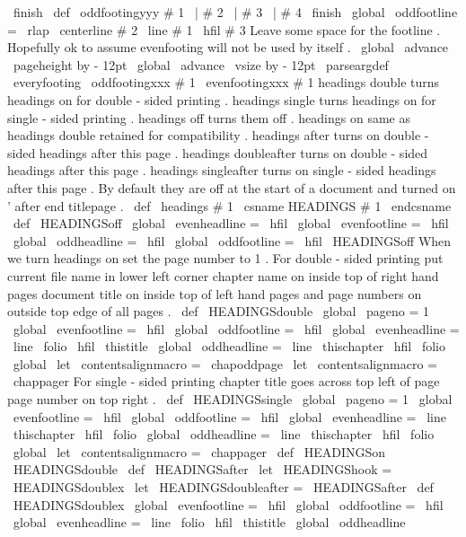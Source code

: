 {{\
finish
}
\
def
\
oddfootingyyy
#
1
\
|
#
2
\
|
#
3
\
|
#
4
\
finish
{
%
\
global
\
oddfootline
=
{
\
rlap
{
\
centerline
{
#
2
}
}
\
line
{
#
1
\
hfil
#
3
}
}
%
%
%
Leave
some
space
for
the
footline
.
Hopefully
ok
to
assume
%
evenfooting
will
not
be
used
by
itself
.
\
global
\
advance
\
pageheight
by
-
12pt
\
global
\
advance
\
vsize
by
-
12pt
}
\
parseargdef
\
everyfooting
{
\
oddfootingxxx
{
#
1
}
\
evenfootingxxx
{
#
1
}
}
%
headings
double
turns
headings
on
for
double
-
sided
printing
.
%
headings
single
turns
headings
on
for
single
-
sided
printing
.
%
headings
off
turns
them
off
.
%
headings
on
same
as
headings
double
retained
for
compatibility
.
%
headings
after
turns
on
double
-
sided
headings
after
this
page
.
%
headings
doubleafter
turns
on
double
-
sided
headings
after
this
page
.
%
headings
singleafter
turns
on
single
-
sided
headings
after
this
page
.
%
By
default
they
are
off
at
the
start
of
a
document
%
and
turned
on
'
after
end
titlepage
.
\
def
\
headings
#
1
{
\
csname
HEADINGS
#
1
\
endcsname
}
\
def
\
HEADINGSoff
{
%
\
global
\
evenheadline
=
{
\
hfil
}
\
global
\
evenfootline
=
{
\
hfil
}
\
global
\
oddheadline
=
{
\
hfil
}
\
global
\
oddfootline
=
{
\
hfil
}
}
\
HEADINGSoff
%
When
we
turn
headings
on
set
the
page
number
to
1
.
%
For
double
-
sided
printing
put
current
file
name
in
lower
left
corner
%
chapter
name
on
inside
top
of
right
hand
pages
document
%
title
on
inside
top
of
left
hand
pages
and
page
numbers
on
outside
top
%
edge
of
all
pages
.
\
def
\
HEADINGSdouble
{
%
\
global
\
pageno
=
1
\
global
\
evenfootline
=
{
\
hfil
}
\
global
\
oddfootline
=
{
\
hfil
}
\
global
\
evenheadline
=
{
\
line
{
\
folio
\
hfil
\
thistitle
}
}
\
global
\
oddheadline
=
{
\
line
{
\
thischapter
\
hfil
\
folio
}
}
\
global
\
let
\
contentsalignmacro
=
\
chapoddpage
}
\
let
\
contentsalignmacro
=
\
chappager
%
For
single
-
sided
printing
chapter
title
goes
across
top
left
of
page
%
page
number
on
top
right
.
\
def
\
HEADINGSsingle
{
%
\
global
\
pageno
=
1
\
global
\
evenfootline
=
{
\
hfil
}
\
global
\
oddfootline
=
{
\
hfil
}
\
global
\
evenheadline
=
{
\
line
{
\
thischapter
\
hfil
\
folio
}
}
\
global
\
oddheadline
=
{
\
line
{
\
thischapter
\
hfil
\
folio
}
}
\
global
\
let
\
contentsalignmacro
=
\
chappager
}
\
def
\
HEADINGSon
{
\
HEADINGSdouble
}
\
def
\
HEADINGSafter
{
\
let
\
HEADINGShook
=
\
HEADINGSdoublex
}
\
let
\
HEADINGSdoubleafter
=
\
HEADINGSafter
\
def
\
HEADINGSdoublex
{
%
\
global
\
evenfootline
=
{
\
hfil
}
\
global
\
oddfootline
=
{
\
hfil
}
\
global
\
evenheadline
=
{
\
line
{
\
folio
\
hfil
\
thistitle
}
}
\
global
\
oddheadline
}}
